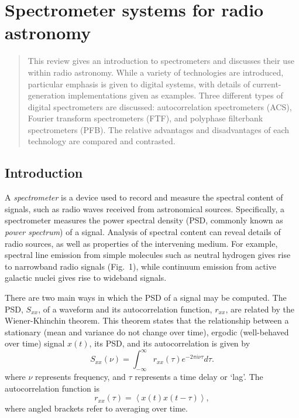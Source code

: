 \documentclass{ws-rv961x669}
\begin{document}
\chapter[Spectrometers]{Spectrometer systems for radio astronomy}\label{spec_chap}

\author[D. Price, J. Hickish and D. Werthimer]{Danny C. Price, Jack Hickish and Dan Werthimer}

\address{Campbell Hall 339, UC Berkeley\\
Address goes here, \\
dancpr@berkeley.edu}

\begin{abstract}
This review gives an introduction to spectrometers and discusses their use within radio astronomy. While a variety of technologies are introduced, particular emphasis is given to digital systems, with details of current-generation implementations given as examples. Three different types of digital spectrometers are discussed: autocorrelation spectrometers (ACS), Fourier transform spectrometers (FTF), and polyphase filterbank spectrometers (PFB). The relative advantages and disadvantages of each technology are compared and contrasted. 

\end{abstract}


\body

\section{Introduction}\label{introduction}

A \emph{spectrometer} is a device used to record and measure the spectral content of signals, such as radio waves received from astronomical sources. Specifically, a spectrometer measures the power spectral density (PSD, commonly known as \emph{power spectrum}) of a signal. Analysis of spectral content can reveal details of radio sources, as well as properties of the intervening medium. For example, spectral line emission from simple molecules such as neutral hydrogen gives rise to narrowband radio signals (Fig.~1), while continuum emission from active galactic nuclei gives rise to wideband signals.


There are two main ways in which the PSD of a signal may be computed. The PSD, $S_{xx}$, of a waveform and its autocorrelation function,  $r_{xx}$, are related by the Wiener-Khinchin theorem. This theorem states that the relationship between a stationary (mean and variance do not change over time), ergodic (well-behaved over time) signal $x(t)$, its PSD, and its autocorrelation is given by
\begin{equation}
S_{xx}(\nu)=\int_{-\infty}^{\infty}r_{xx}(\tau)e^{-2\pi i\nu\tau}d\tau.
\label{eq:psd}
\end{equation}
where $\nu$ represents frequency, and $\tau$ represents a time delay or `lag'. The autocorrelation function is
\begin{equation}
r_{xx}(\tau)=\left\langle x(t)x(t-\tau)\right\rangle,
\end{equation}
where angled brackets refer to averaging over time. 
\end{document}
